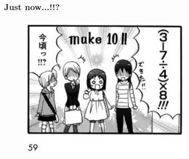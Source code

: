 \documentclass{beamer}                             %
\begin{document}
\begin{frame}
\frametitle{Just now...!!?}
\framesubtitle{}

\begin{figure}[h!]
  \centering
  \includegraphics[width=0.75\textwidth]{figures/imagoro.png}
\end{figure}
\end{frame}
\end{document}
